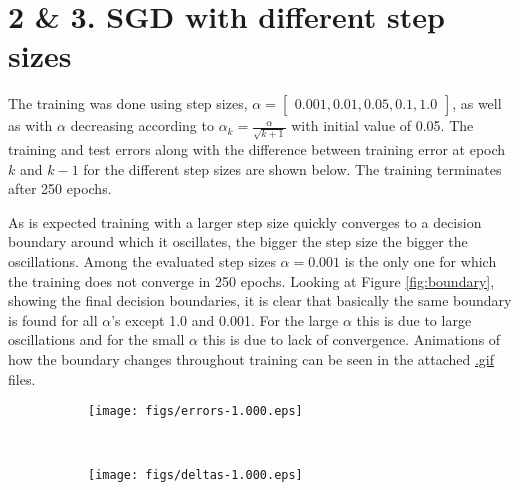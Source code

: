 \documentclass{article}
\begin{document}
\section*{2 \& 3. SGD with different step sizes}
The training was done using step sizes, $\alpha = \begin{bmatrix}
    0.001, 0.01, 0.05, 0.1, 1.0
\end{bmatrix}$, as well as with $\alpha$ decreasing according to $\alpha_k = \frac{\alpha}{\sqrt{k+1}}$ with initial value of 0.05. The training and test errors along with the difference between training error at epoch $k$ and $k-1$ for the different step sizes are shown below. The training terminates after 250 epochs.

As is expected training with a larger step size quickly converges to a decision boundary around which it oscillates, the bigger the step size the bigger the oscillations. Among the evaluated step sizes $\alpha = 0.001$ is the only one for which the training does not converge in 250 epochs. Looking at Figure \ref{fig:boundary}, showing the final decision boundaries, it is clear that basically the same boundary is found for all $\alpha$'s except 1.0 and 0.001. For the large $\alpha$ this is due to large oscillations and for the small $\alpha$ this is due to lack of convergence. Animations of how the boundary changes throughout training can be seen in the attached \url{.gif} files.

\begin{figure}[ht]
    \centering
    \begin{subfigure}[t]{0.48\textwidth}
        \centering
        \texttt{[image: figs/errors-1.000.eps]}
        \caption{}
    \end{subfigure}
    ~
    \centering
    \begin{subfigure}[t]{0.48\textwidth}
        \centering
        \texttt{[image: figs/deltas-1.000.eps]}
        \caption{}
    \end{subfigure}
    \caption{}
\end{figure}
\end{document}
